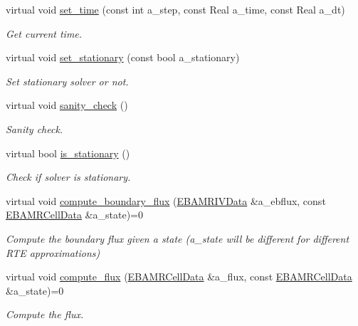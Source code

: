 \begin{DoxyCompactItemize}
virtual void \hyperlink{classrte__solver_a451cdec585ea4445e62dbfe59add6a29}{set\+\_\+time} (const int a\+\_\+step, const Real a\+\_\+time, const Real a\+\_\+dt)
\begin{DoxyCompactList}\small\item\em Get current time. \end{DoxyCompactList}\item 
virtual void \hyperlink{classrte__solver_acb5161cdcc45d2c05d9be77b33e227cf}{set\+\_\+stationary} (const bool a\+\_\+stationary)
\begin{DoxyCompactList}\small\item\em Set stationary solver or not. \end{DoxyCompactList}\item 
virtual void \hyperlink{classrte__solver_ac3e775fdbe76ebb3f82d81dcee33e3eb}{sanity\+\_\+check} ()
\begin{DoxyCompactList}\small\item\em Sanity check. \end{DoxyCompactList}\item 
virtual bool \hyperlink{classrte__solver_a02191b6bfb6554bfb0c97ec7a7de8257}{is\+\_\+stationary} ()
\begin{DoxyCompactList}\small\item\em Check if solver is stationary. \end{DoxyCompactList}\item 
virtual void \hyperlink{classrte__solver_ad972a3283a579644e6c8caf9479f448d}{compute\+\_\+boundary\+\_\+flux} (\hyperlink{type__definitions_8H_a6b8fa905d55cbb491b52180386f0e0c1}{E\+B\+A\+M\+R\+I\+V\+Data} \&a\+\_\+ebflux, const \hyperlink{type__definitions_8H_a7e610f301989e5e07781c5e338bdb7c3}{E\+B\+A\+M\+R\+Cell\+Data} \&a\+\_\+state)=0
\begin{DoxyCompactList}\small\item\em Compute the boundary flux given a state (a\+\_\+state will be different for different R\+TE approximations) \end{DoxyCompactList}\item 
virtual void \hyperlink{classrte__solver_aaddf204457acb74cb46c346fc78fd1d5}{compute\+\_\+flux} (\hyperlink{type__definitions_8H_a7e610f301989e5e07781c5e338bdb7c3}{E\+B\+A\+M\+R\+Cell\+Data} \&a\+\_\+flux, const \hyperlink{type__definitions_8H_a7e610f301989e5e07781c5e338bdb7c3}{E\+B\+A\+M\+R\+Cell\+Data} \&a\+\_\+state)=0
\begin{DoxyCompactList}\small\item\em Compute the flux. \end{DoxyCompactList}\item 

\end{DoxyCompactItemize}
